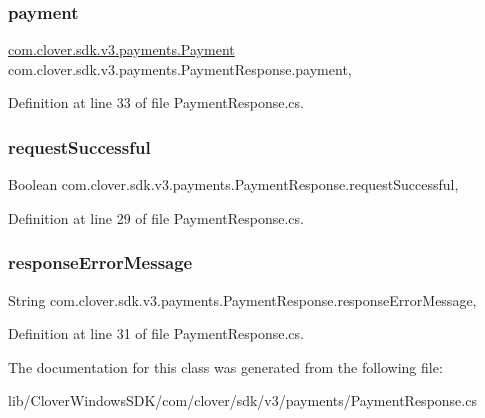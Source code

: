 \subsubsection{\texorpdfstring{payment}{payment}}
{\footnotesize\ttfamily \hyperlink{classcom_1_1clover_1_1sdk_1_1v3_1_1payments_1_1_payment}{com.\+clover.\+sdk.\+v3.\+payments.\+Payment} com.\+clover.\+sdk.\+v3.\+payments.\+Payment\+Response.\+payment\hspace{0.3cm}{\ttfamily [get]}, {\ttfamily [set]}}



Definition at line 33 of file Payment\+Response.\+cs.

\mbox{\label{classcom_1_1clover_1_1sdk_1_1v3_1_1payments_1_1_payment_response_a193f43a3b183e43a65c454507ce76620}} 
\subsubsection{\texorpdfstring{request\+Successful}{requestSuccessful}}
{\footnotesize\ttfamily Boolean com.\+clover.\+sdk.\+v3.\+payments.\+Payment\+Response.\+request\+Successful\hspace{0.3cm}{\ttfamily [get]}, {\ttfamily [set]}}



Definition at line 29 of file Payment\+Response.\+cs.

\mbox{\label{classcom_1_1clover_1_1sdk_1_1v3_1_1payments_1_1_payment_response_a0acd3c1ee0af687821b0686277282c36}} 
\subsubsection{\texorpdfstring{response\+Error\+Message}{responseErrorMessage}}
{\footnotesize\ttfamily String com.\+clover.\+sdk.\+v3.\+payments.\+Payment\+Response.\+response\+Error\+Message\hspace{0.3cm}{\ttfamily [get]}, {\ttfamily [set]}}



Definition at line 31 of file Payment\+Response.\+cs.



The documentation for this class was generated from the following file\+:\begin{DoxyCompactItemize}
\item 
lib/\+Clover\+Windows\+S\+D\+K/com/clover/sdk/v3/payments/Payment\+Response.\+cs\end{DoxyCompactItemize}
